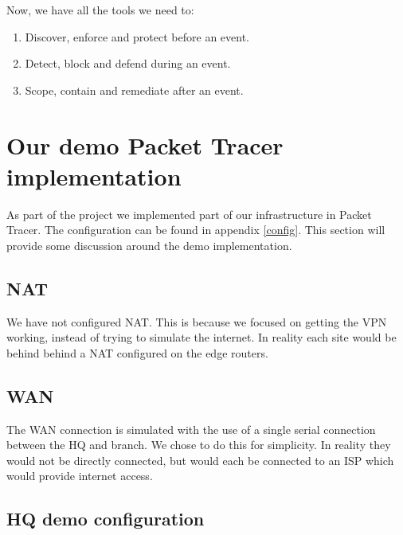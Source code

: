 Now, we have all the tools we need to:
\begin{enumerate}
    \item Discover, enforce and protect before an event.
    \item Detect, block and defend during an event.
    \item Scope, contain and remediate after an event.
\end{enumerate}



\section{Our demo Packet Tracer implementation} \label{democonfigdiscussion}


As part of the project we implemented part of our infrastructure in Packet Tracer. The configuration can be found in appendix \ref{config}. This section will provide some discussion around the demo implementation.

\subsection{NAT}

We have not configured NAT. This is because we focused on getting the VPN working, instead of trying to simulate the internet. In reality each site would be behind behind a NAT configured on the edge routers.

\subsection{WAN}

The WAN connection is simulated with the use of a single serial connection between the HQ and branch. We chose to do this for simplicity. In reality they would not be directly connected, but would each be connected to an ISP which would provide internet access.

\subsection{HQ demo configuration}

